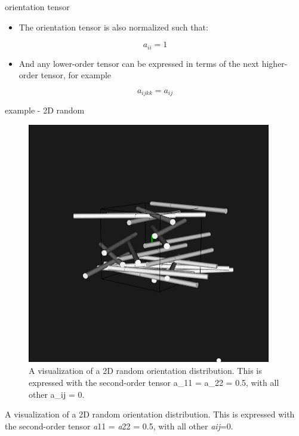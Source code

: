 \documentclass[
  letterpaper,
  ignorenonframetext,
  aspectratio=43,
  handout,
  12pt]{beamer}
\providecommand{\tightlist}{%
  \setlength{\itemsep}{0pt}\setlength{\parskip}{0pt}}
\providecommand{\tightlist}{%
\setlength{\itemsep}{0pt}\setlength{\parskip}{0pt}}
\let\Oldincludegraphics\includegraphics
\renewcommand{\includegraphics}[2][]{\Oldincludegraphics[width=\textwidth,height=0.7\textheight,keepaspectratio]{#2}}
\begin{document}
\begin{frame}{orientation tensor}
\protect\hypertarget{orientation-tensor-2}{}
\begin{itemize}
\tightlist
\item
  The orientation tensor is also normalized such that:
\end{itemize}

\[a_{ii} = 1\]

\begin{itemize}
\tightlist
\item
  And any lower-order tensor can be expressed in terms of the next
  higher-order tensor, for example
\end{itemize}

\[a_{ijkk} = a_{ij}\]
\end{frame}

\begin{frame}{example - 2D random}
\protect\hypertarget{example---2d-random}{}
\begin{figure}
\centering
\includegraphics{../images/random2D.PNG}
\caption{A visualization of a 2D random orientation distribution. This
is expressed with the second-order tensor a\_11 = a\_22 = 0.5, with all
other a\_ij = 0.}
\end{figure}

A visualization of a 2D random orientation distribution. This is
expressed with the second-order tensor \emph{a}11 = \emph{a}22 = 0.5,
with all other \emph{a}\emph{ij}=0.
\end{frame}
\end{document}
